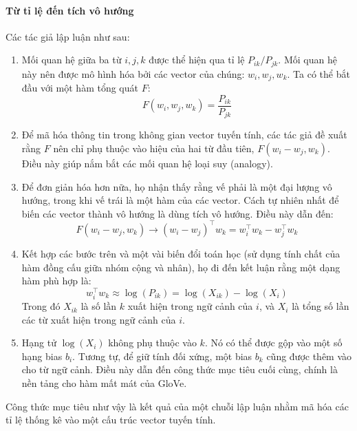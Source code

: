 \paragraph{Từ tỉ lệ đến tích vô hướng}
Các tác giả lập luận như sau:
\begin{enumerate}
    \item Mối quan hệ giữa ba từ $i, j, k$ được thể hiện qua tỉ lệ $P_{ik}/P_{jk}$. Mối quan hệ này nên được mô hình hóa bởi các vector của chúng: $w_i, w_j, w_k$. Ta có thể bắt đầu với một hàm tổng quát $F$:
    \[ F(w_i, w_j, w_k) = \frac{P_{ik}}{P_{jk}} \]
    \item Để mã hóa thông tin trong không gian vector tuyến tính, các tác giả đề xuất rằng $F$ nên chỉ phụ thuộc vào hiệu của hai từ đầu tiên, $F(w_i - w_j, w_k)$. Điều này giúp nắm bắt các mối quan hệ loại suy (analogy).
    \item Để đơn giản hóa hơn nữa, họ nhận thấy rằng vế phải là một đại lượng vô hướng, trong khi vế trái là một hàm của các vector. Cách tự nhiên nhất để biến các vector thành vô hướng là dùng tích vô hướng. Điều này dẫn đến:
    \[ F(w_i - w_j, w_k) \rightarrow (w_i - w_j)^\top w_k = w_i^\top w_k - w_j^\top w_k \]
    \item Kết hợp các bước trên và một vài biến đổi toán học (sử dụng tính chất của hàm đồng cấu giữa nhóm cộng và nhân), họ đi đến kết luận rằng một dạng hàm phù hợp là:
    \[ w_i^\top w_k \approx \log(P_{ik}) = \log(X_{ik}) - \log(X_i) \]
    Trong đó $X_{ik}$ là số lần $k$ xuất hiện trong ngữ cảnh của $i$, và $X_i$ là tổng số lần các từ xuất hiện trong ngữ cảnh của $i$.
    \item Hạng tử $\log(X_i)$ không phụ thuộc vào $k$. Nó có thể được gộp vào một số hạng bias $b_i$. Tương tự, để giữ tính đối xứng, một bias $b_k$ cũng được thêm vào cho từ ngữ cảnh. Điều này dẫn đến công thức mục tiêu cuối cùng, chính là nền tảng cho hàm mất mát của GloVe.
\end{enumerate}
Công thức mục tiêu như vậy là kết quả của một chuỗi lập luận nhằm mã hóa các tỉ lệ thống kê vào một cấu trúc vector tuyến tính.


